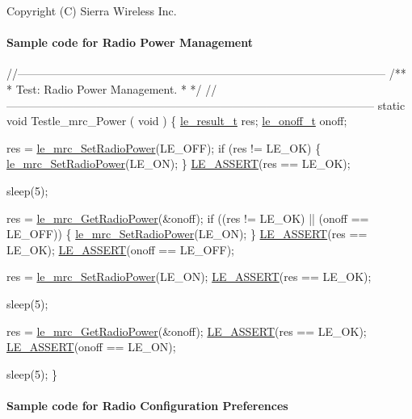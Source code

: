 Copyright (C) Sierra Wireless Inc. \hypertarget{c_mrcRadioPower}{}\paragraph{Sample code for Radio Power Management}\label{c_mrcRadioPower}

\begin{DoxyCodeInclude}
\textcolor{comment}{//--------------------------------------------------------------------------------------------------}\textcolor{comment}{}
\textcolor{comment}{/**}
\textcolor{comment}{ * Test: Radio Power Management.}
\textcolor{comment}{ *}
\textcolor{comment}{ */}
\textcolor{comment}{//--------------------------------------------------------------------------------------------------}
\textcolor{keyword}{static} \textcolor{keywordtype}{void} Testle\_mrc\_Power
(
    \textcolor{keywordtype}{void}
)
\{
    \hyperlink{le__basics_8h_a1cca095ed6ebab24b57a636382a6c86c}{le\_result\_t}   res;
    \hyperlink{le__basics_8h_ae2138c90c41d30e2d510be01d8b374da}{le\_onoff\_t}    onoff;

    res = \hyperlink{le__mrc__interface_8h_a78bd27d92337e2122320f41bcaa5480f}{le\_mrc\_SetRadioPower}(LE\_OFF);
    \textcolor{keywordflow}{if} (res != LE\_OK)
    \{
        \hyperlink{le__mrc__interface_8h_a78bd27d92337e2122320f41bcaa5480f}{le\_mrc\_SetRadioPower}(LE\_ON);
    \}
    \hyperlink{le__log_8h_ac0dbbef91dc0fed449d0092ff0557b39}{LE\_ASSERT}(res == LE\_OK);

    sleep(5);

    res = \hyperlink{le__mrc__interface_8h_aac51332c6c84e460746eb1ad45c064d6}{le\_mrc\_GetRadioPower}(&onoff);
    \textcolor{keywordflow}{if} ((res != LE\_OK) || (onoff == LE\_OFF))
    \{
        \hyperlink{le__mrc__interface_8h_a78bd27d92337e2122320f41bcaa5480f}{le\_mrc\_SetRadioPower}(LE\_ON);
    \}
    \hyperlink{le__log_8h_ac0dbbef91dc0fed449d0092ff0557b39}{LE\_ASSERT}(res == LE\_OK);
    \hyperlink{le__log_8h_ac0dbbef91dc0fed449d0092ff0557b39}{LE\_ASSERT}(onoff == LE\_OFF);

    res = \hyperlink{le__mrc__interface_8h_a78bd27d92337e2122320f41bcaa5480f}{le\_mrc\_SetRadioPower}(LE\_ON);
    \hyperlink{le__log_8h_ac0dbbef91dc0fed449d0092ff0557b39}{LE\_ASSERT}(res == LE\_OK);

    sleep(5);

    res = \hyperlink{le__mrc__interface_8h_aac51332c6c84e460746eb1ad45c064d6}{le\_mrc\_GetRadioPower}(&onoff);
    \hyperlink{le__log_8h_ac0dbbef91dc0fed449d0092ff0557b39}{LE\_ASSERT}(res == LE\_OK);
    \hyperlink{le__log_8h_ac0dbbef91dc0fed449d0092ff0557b39}{LE\_ASSERT}(onoff == LE\_ON);

    sleep(5);
\}
\end{DoxyCodeInclude}
\hypertarget{c_mrcRadioConfigurationPreferences}{}\paragraph{Sample code for Radio Configuration Preferences}\label{c_mrcRadioConfigurationPreferences}


